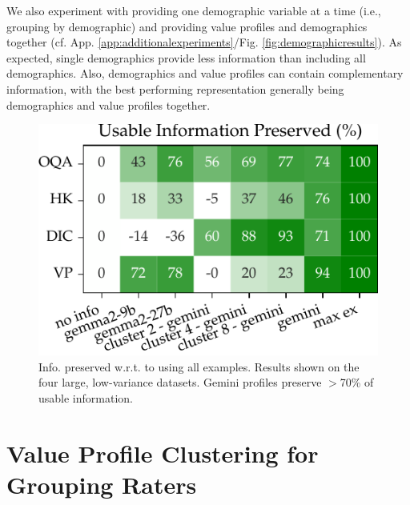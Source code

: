 \documentclass[11pt]{article}
\begin{document}
We also experiment with providing one demographic variable at a time (i.e., grouping by demographic) and providing value profiles and demographics together (cf. App. \ref{app:additionalexperiments}/Fig. \ref{fig:demographicresults}). As expected, single demographics provide less information than including all demographics. Also, demographics and value profiles can contain complementary information, with the best performing representation generally being demographics and value profiles together.


\begin{figure}
\centering
\vspace{-5pt}
\includegraphics[width=0.7\columnwidth]{files/info_preserved_small.pdf}
\caption{
Info. preserved w.r.t. to using all examples. Results shown on the four large, low-variance datasets.
Gemini profiles preserve $>$70\% of usable information.
}
\label{fig:info_preserved}
\vspace{-15pt}
\end{figure}

\section{Value Profile Clustering for Grouping Raters}
\label{sec:clustering}
\end{document}
